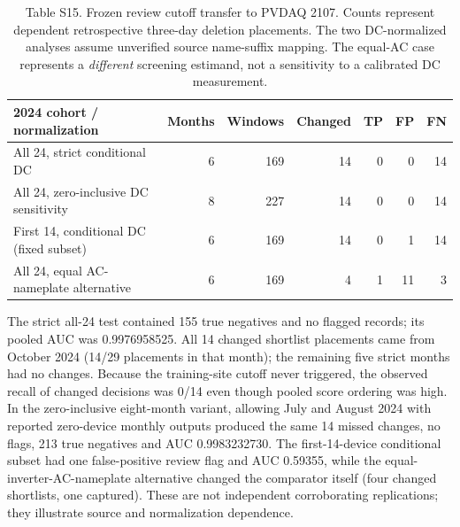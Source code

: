 \documentclass[11pt]{article}
\begin{document}
\begin{table}[htbp]
\centering
\caption*{Table S15. Frozen review cutoff transfer to PVDAQ 2107. Counts represent dependent retrospective three-day deletion placements. The two DC-normalized analyses assume unverified source name-suffix mapping. The equal-AC case represents a \emph{different} screening estimand, not a sensitivity to a calibrated DC measurement.}
\footnotesize
\setlength{\tabcolsep}{4pt}
\begin{tabular}{p{4.1cm}rrrrrr}
\toprule
2024 cohort / normalization & Months & Windows & Changed & TP & FP & FN \\
\midrule
All 24, strict conditional DC & 6 & 169 & 14 & 0 & 0 & 14 \\
All 24, zero-inclusive DC sensitivity & 8 & 227 & 14 & 0 & 0 & 14 \\
First 14, conditional DC (fixed subset) & 6 & 169 & 14 & 0 & 1 & 14 \\
All 24, equal AC-nameplate alternative & 6 & 169 & 4 & 1 & 11 & 3 \\
\bottomrule
\end{tabular}
\end{table}

The strict all-24 test contained 155 true negatives and no flagged records; its pooled AUC was 0.9976958525. All 14 changed shortlist placements came from October 2024 (14/29 placements in that month); the remaining five strict months had no changes. Because the training-site cutoff never triggered, the observed recall of changed decisions was 0/14 even though pooled score ordering was high. In the zero-inclusive eight-month variant, allowing July and August 2024 with reported zero-device monthly outputs produced the same 14 missed changes, no flags, 213 true negatives and AUC 0.9983232730. The first-14-device conditional subset had one false-positive review flag and AUC 0.59355, while the equal-inverter-AC-nameplate alternative changed the comparator itself (four changed shortlists, one captured). These are not independent corroborating replications; they illustrate source and normalization dependence.
\end{document}
